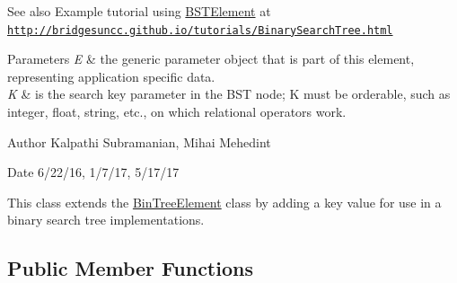 \begin{DoxySeeAlso}{See also}
Example tutorial using \mbox{\hyperlink{classbridges_1_1base_1_1_b_s_t_element}{B\+S\+T\+Element}} at \href{http://bridgesuncc.github.io/tutorials/BinarySearchTree.html}{\tt http\+://bridgesuncc.\+github.\+io/tutorials/\+Binary\+Search\+Tree.\+html}
\end{DoxySeeAlso}

\begin{DoxyParams}{Parameters}
{\em E} & the generic parameter object that is part of this element, representing application specific data. \\
\hline
{\em K} & is the search key parameter in the B\+ST node; K must be orderable, such as integer, float, string, etc., on which relational operators work.\\
\hline
\end{DoxyParams}
\begin{DoxyAuthor}{Author}
Kalpathi Subramanian, Mihai Mehedint
\end{DoxyAuthor}
\begin{DoxyDate}{Date}
6/22/16, 1/7/17, 5/17/17
\end{DoxyDate}
This class extends the \mbox{\hyperlink{classbridges_1_1base_1_1_bin_tree_element}{Bin\+Tree\+Element}} class by adding a \textquotesingle{}key\textquotesingle{} value for use in a binary search tree implementations. \subsection*{Public Member Functions}
